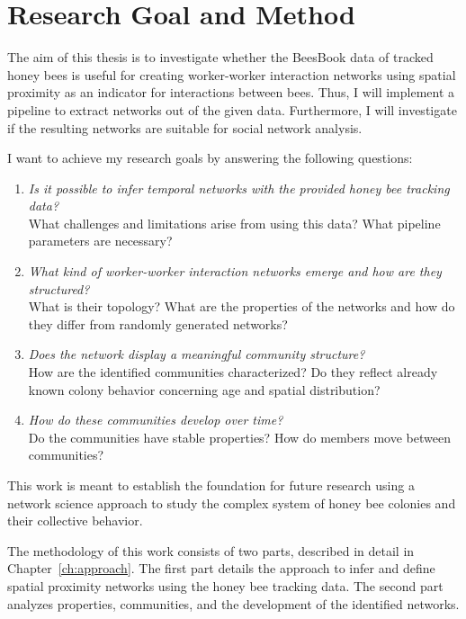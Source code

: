 \section{Research Goal and Method}
\label{sec:intro:goals}
The aim of this thesis is to investigate whether the BeesBook data of tracked honey bees is useful for creating worker-worker interaction networks using spatial proximity as an indicator for interactions between bees.
Thus, I will implement a pipeline to extract networks out of the given data. Furthermore, I will investigate if the resulting networks are suitable for social network analysis.

I want to achieve my research goals by answering the following questions:

\begin{enumerate}
\item \emph{Is it possible to infer temporal networks with the provided honey bee tracking data?}\\
What challenges and limitations arise from using this data?
What pipeline parameters are necessary?
\item \emph{What kind of worker-worker interaction networks emerge and how are they structured?}\\
What is their topology?
What are the properties of the networks and how do they differ from randomly generated networks?
\item \emph{Does the network display a meaningful community structure?}\\
How are the identified communities characterized?
Do they reflect already known colony behavior concerning age and spatial distribution?
\item \emph{How do these communities develop over time?}\\
Do the communities have stable properties?
How do members move between communities?
\end{enumerate}


This work is meant to establish the foundation for future research using a network science approach to study the complex system of honey bee colonies and their collective behavior.

The methodology of this work consists of two parts, described in detail in Chapter~\ref{ch:approach}.
The first part details the approach to infer and define spatial proximity networks using the honey bee tracking data.
The second part analyzes properties, communities, and the development of the identified networks.  

